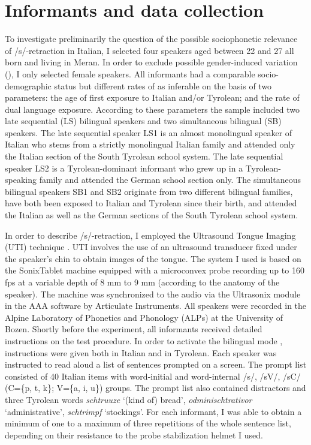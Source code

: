 \documentclass[output=paper]{LSP/langsci}
\begin{document}
\section{Informants and data collection}
\largerpage
To investigate preliminarily the question of the possible sociophonetic relevance of /s/-retraction in Italian, I selected four speakers aged between 22 and 27 all born and living in Meran. In order to exclude possible gender-induced variation (\cite{fuchs_differences_2011}), I only selected female speakers. All informants had a comparable socio-demographic status but different rates of  as inferable on the basis of two parameters: the age of first exposure to Italian and/or Tyrolean; and the rate of dual language exposure. According to these parameters the sample included two late sequential (LS) bilingual speakers and two simultaneous bilingual (SB) speakers. The late sequential speaker LS1 is an almost monolingual speaker of Italian who stems from a strictly monolingual Italian family and attended only the Italian section of the South Tyrolean school system. The late sequential speaker LS2 is a Tyrolean-dominant informant who grew up in a Tyrolean-speaking family and attended the German school section only. The simultaneous bilingual speakers SB1 and SB2 originate from two different bilingual families, have both been exposed to Italian and Tyrolean since their birth, and attended the Italian as well as the German sections of the South Tyrolean school system.

In order to describe /s/-retraction, I employed the Ultrasound Tongue Imaging (UTI) technique \citep{stone_guide_2005}. UTI involves the use of an ultrasound transducer fixed under the speaker’s chin to obtain images of the tongue. The system I used is based on the SonixTablet machine equipped with a microconvex probe recording up to 160 fps at a variable depth of 8 mm to 9 mm (according to the anatomy of the speaker). The machine was synchronized to the audio via the Ultrasonix module in the AAA software by Articulate Instruments. All speakers were recorded in the Alpine Laboratory of Phonetics and Phonology (ALPs) at the University of Bozen. Shortly before the experiment, all informants received detailed instructions on the test procedure. In order to activate the bilingual mode \citep{grosjean_transfer_1998}, instructions were given both in Italian and in Tyrolean. Each speaker was instructed to read aloud a list of sentences prompted on a screen. The prompt list consisted of 40 Italian items with word-initial and word-internal /s/, /sV/, /sC/ (C=\{p, t, k\}; V=\{a, i, u\}) groups. The prompt list also contained distractors and three Tyrolean words \textit{schtruuze} `(kind of) bread', \textit{odminischtrativor} `administrative', \textit{schtrimpf} `stockings'. For each informant, I was able to obtain a minimum of one to a maximum of three repetitions of the whole sentence list, depending on their resistance to the probe stabilization helmet I used.
\end{document}
